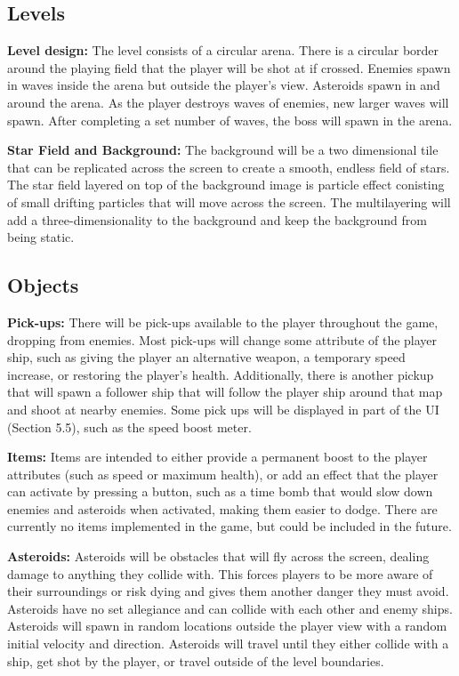 \documentclass[12pt]{article}       %
\begin{document}
\subsection{Levels} %

	{\bf Level design:} The level consists of a circular arena. There is a circular border around the playing field that the player will be shot at if crossed. Enemies spawn in waves inside the arena but outside the player's view. Asteroids spawn in and around the arena. As the player destroys waves of enemies, new larger waves will spawn. After completing a set number of waves, the boss will spawn in the arena.

	{\bf Star Field and Background:} The background will be a two dimensional tile that can be replicated across the screen to create a smooth, endless field of stars. The star field layered on top of the background image is particle effect conisting of small drifting particles that will move across the screen. The multilayering will add a three-dimensionality to the background and keep the background from being static.

\subsection{Objects} %

	{\bf Pick-ups:}  There will be pick-ups available to the player throughout the game, dropping from enemies. Most pick-ups will change some attribute of the player ship, such as giving the player an alternative weapon, a temporary speed increase, or restoring the player's health. Additionally, there is another pickup that will spawn a follower ship that will follow the player ship around that map and shoot at nearby enemies. Some pick ups will be displayed in part of the UI (Section 5.5), such as the speed boost meter.

	{\bf  Items:} Items are intended to either provide a permanent boost to the player attributes (such as speed or maximum health), or add an effect that the player can activate by pressing a button, such as a time bomb that would slow down enemies and asteroids when activated, making them easier to dodge. There are currently no items implemented in the game, but could be included in the future. 

	{\bf Asteroids:}  Asteroids will be obstacles that will fly across the screen, dealing damage to anything they collide with. This forces players to be more aware of their surroundings or risk dying and gives them another danger they must avoid. Asteroids have no set allegiance and can collide with each other and enemy ships. Asteroids will spawn in random locations outside the player view with a random initial velocity and direction. Asteroids will travel until they either collide with a ship, get shot by the player, or travel outside of the level boundaries.
\end{document}
